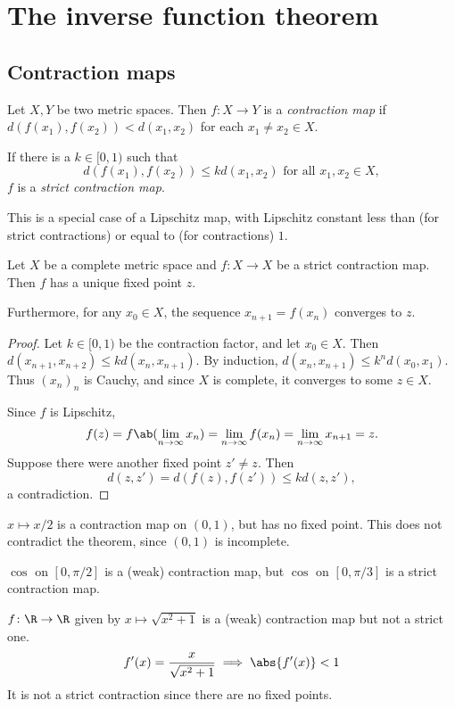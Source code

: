 \section{The inverse function theorem} \label{sec:ift}

\subsection{Contraction maps} \label{sec:contraction-maps}
\begin{definition*} \label{def:contract}
    Let $X, Y$ be two metric spaces.
    Then $f\colon X \to Y$ is a \emph{contraction map} if
    $d(f(x_1), f(x_2)) < d(x_1, x_2)$ for each $x_1 \ne x_2 \in X$.

    If there is a $k \in [0, 1)$ such that \[
        d(f(x_1), f(x_2)) \le k d(x_1, x_2) \text{ for all } x_1, x_2 \in X,
    \] $f$ is a \emph{strict contraction map}.
\end{definition*}
This is a special case of a Lipschitz map, with Lipschitz constant less
than (for strict contractions) or equal to (for contractions) $1$.

\begin{theorem*} \label{thm:banach}
    Let $X$ be a complete metric space and $f\colon X \to X$ be a
    strict contraction map.
    Then $f$ has a unique fixed point $z$.

    Furthermore, for any $x_0 \in X$, the sequence $x_{n+1} = f(x_n)$
    converges to $z$.
\end{theorem*}
\begin{proof}
    Let $k \in [0, 1)$ be the contraction factor, and let $x_0 \in X$.
    Then $d(x_{n+1}, x_{n+2}) \le k d(x_n, x_{n+1})$.
    By induction, $d(x_n, x_{n+1}) \le k^n d(x_0, x_1)$.
    Thus $(x_n)_n$ is Cauchy, and since $X$ is complete, it converges to
    some $z \in X$.

    Since $f$ is Lipschitz, \[
        f(z) = f\ab(\lim_{n \to \infty} x_n)
            = \lim_{n \to \infty} f(x_n)
            = \lim_{n \to \infty} x_{n+1}
            = z.
    \] Suppose there were another fixed point $z' \ne z$.
    Then \[
        d(z, z') = d(f(z), f(z')) \le k d(z, z'),
    \] a contradiction.
\end{proof}

\begin{examples}
    \item $x \mapsto x/2$ is a contraction map on $(0, 1)$, but has no fixed
    point.
    This does not contradict the theorem, since $(0, 1)$ is incomplete.
    \item $\cos$ on $[0, \pi/2]$ is a (weak) contraction map,
    but $\cos$ on $[0, \pi/3]$ is a strict contraction map.
    \item $f\colon \R \to \R$ given by $x \mapsto \sqrt{x^2 + 1}$ is a
    (weak) contraction map but not a strict one. \[
        f'(x) = \frac{x}{\sqrt{x^2 + 1}} \implies \abs{f'(x)} < 1
    \] It is not a strict contraction since there are no fixed points.
\end{examples}
